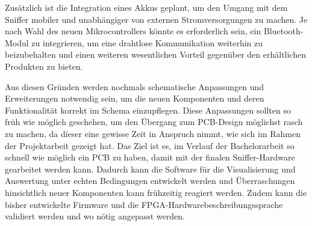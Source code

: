 Zusätzlich ist die Integration eines Akkus geplant, um den Umgang mit dem Sniffer mobiler und unabhängiger von externen Stromversorgungen zu machen. Je nach Wahl des neuen Mikrocontrollers könnte es erforderlich sein, ein Bluetooth-Modul zu integrieren, um eine drahtlose Kommunikation weiterhin zu beizubehalten und einen weiteren wesentlichen Vorteil gegenüber den erhältlichen Produkten zu bieten.

Aus diesen Gründen werden nochmals schematische Anpassungen und Erweiterungen notwendig sein, um die neuen Komponenten und deren Funktionalität korrekt im Schema einzupflegen. Diese Anpassungen sollten so früh wie möglich geschehen, um den Übergang zum PCB-Design möglichst rasch zu machen, da dieser eine gewisse Zeit in Anspruch nimmt, wie sich im Rahmen der Projektarbeit gezeigt hat. Das Ziel ist es, im Verlauf der Bachelorarbeit so schnell wie möglich ein PCB zu haben, damit mit der finalen Sniffer-Hardware gearbeitet werden kann. Dadurch kann die Software für die Visualisierung und Auswertung unter echten Bedingungen entwickelt werden und Überraschungen hinsichtlich neuer Komponenten kann frühzeitig reagiert werden. Zudem kann die bisher entwickelte Firmware und die FPGA-Hardwarebeschreibungssprache validiert werden und wo nötig angepasst werden.
